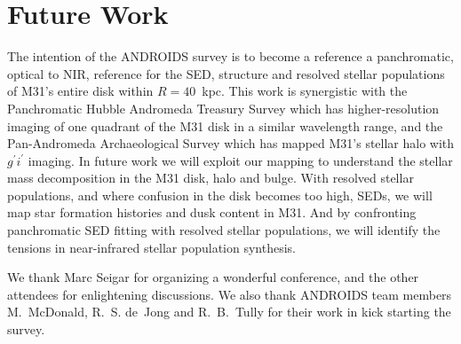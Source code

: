 \documentclass[11pt,twoside]{article}
\begin{document}
\section{Future Work}

The intention of the ANDROIDS survey is to become a reference a panchromatic, optical to NIR, reference for the SED, structure and resolved stellar populations of M31's entire disk within $R=40$~kpc.
This work is synergistic with the Panchromatic Hubble Andromeda Treasury Survey \citep[PHAT;][]{Dalcanton:2012} which has higher-resolution imaging of one quadrant of the M31 disk in a similar wavelength range, and the Pan-Andromeda Archaeological Survey \citep[PAndAS;][]{McConnachie:2009} which has mapped M31's stellar halo with $g^\prime i^\prime$ imaging.
In future work we will exploit our mapping to understand the stellar mass decomposition in the M31 disk, halo and bulge.
With resolved stellar populations, and where confusion in the disk becomes too high, SEDs, we will map star formation histories and dusk content in M31.
And by confronting panchromatic SED fitting with resolved stellar populations, we will identify the tensions in near-infrared stellar population synthesis.

\acknowledgements We thank Marc Seigar for organizing a wonderful conference, and the other attendees for enlightening discussions. We also thank ANDROIDS team members M.~McDonald, R.~S. de~Jong and R.~B.~Tully for their work in kick starting the survey.


\end{document}
